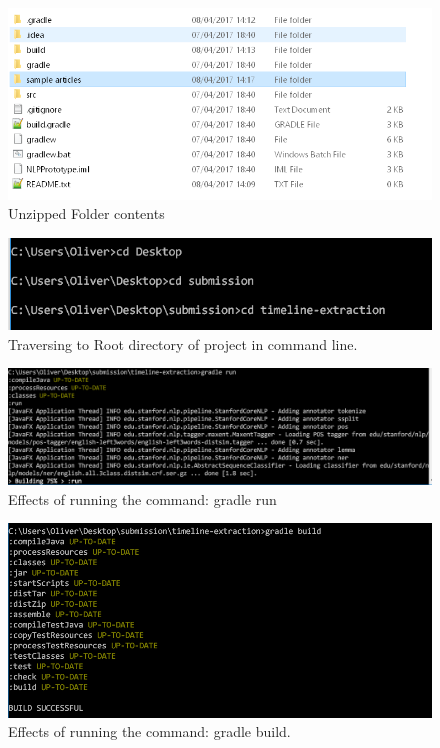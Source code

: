 \begin{figure}[H]
\caption{Unzipped Folder contents}
\label{fig:folderDirectory}
\includegraphics{folderDirectory.PNG}
\centering
\end{figure}

\begin{figure}[H]
\caption{Traversing to Root directory of project in command line.}
\label{fig:traverseToRootDir}
\includegraphics{traverseToRootDir.PNG}
\centering
\end{figure}

\begin{figure}[H]
\caption{Effects of running the command: gradle run}
\label{fig:gradleRun}
\includegraphics[width=\linewidth]{gradleRun.PNG}
\centering
\end{figure}

\begin{figure}[H]
\caption{Effects of running the command: gradle build.}
\label{fig:gradleBuild}
\includegraphics[width=\linewidth]{gradleBuild.PNG}
\centering
\end{figure}

